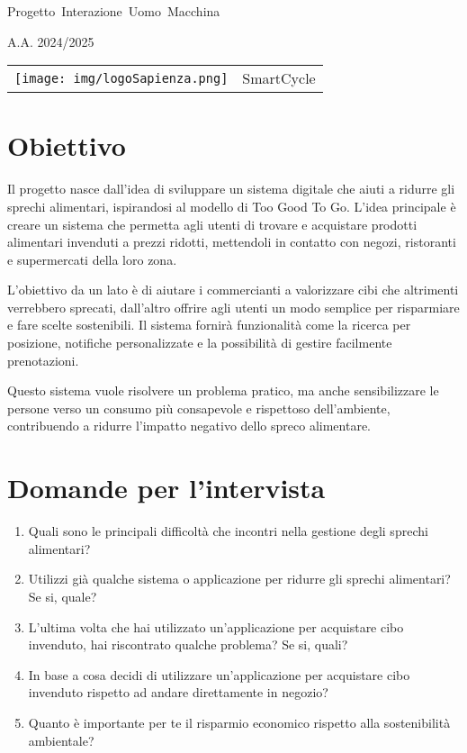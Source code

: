 \documentclass{article}
\author{Alessandro Dori}
\date{\today}
\begin{document}
\hbox{\Huge Progetto Interazione Uomo Macchina}
\begin{center}
    \Huge A.A. 2024/2025
\end{center}

\begin{center}
    \begin{tabular}{c c}
        \texttt{[image: img/logoSapienza.png]} & \huge SmartCycle \\
    \end{tabular}
\end{center}

\section*{Obiettivo}
Il progetto nasce dall'idea di sviluppare un sistema digitale che aiuti a ridurre gli sprechi alimentari, ispirandosi al modello di Too Good To Go. 
L’idea principale è creare un sistema che permetta agli utenti di trovare e acquistare prodotti alimentari invenduti a prezzi ridotti, mettendoli in contatto con negozi, ristoranti e supermercati della loro zona.

L’obiettivo da un lato è di aiutare i commercianti a valorizzare cibi che altrimenti verrebbero sprecati, dall’altro offrire agli utenti un modo semplice per risparmiare e fare scelte sostenibili. 
Il sistema fornirà funzionalità come la ricerca per posizione, notifiche personalizzate e la possibilità di gestire facilmente prenotazioni.

Questo sistema vuole risolvere un problema pratico, ma anche sensibilizzare le persone verso un consumo più consapevole e rispettoso dell’ambiente, contribuendo a ridurre l’impatto negativo dello spreco alimentare.

\section*{Domande per l'intervista}
\begin{enumerate}
    \item Quali sono le principali difficoltà che incontri nella gestione degli sprechi alimentari?
    \item Utilizzi già qualche sistema o applicazione per ridurre gli sprechi alimentari? Se si, quale?
    \item L'ultima volta che hai utilizzato un'applicazione per acquistare cibo invenduto, hai riscontrato qualche problema? Se si, quali?
    \item In base a cosa decidi di utilizzare un'applicazione per acquistare cibo invenduto rispetto ad andare direttamente in negozio?
    \item Quanto è importante per te il risparmio economico rispetto alla sostenibilità ambientale?
\end{enumerate}
\end{document}
